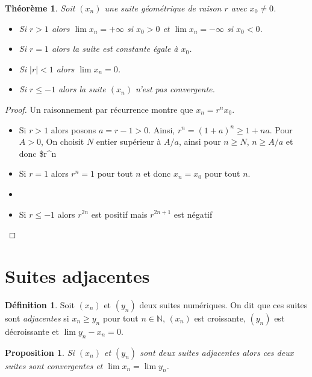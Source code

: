 \documentclass[
]{book}
\providecommand{\tightlist}{%
  \setlength{\itemsep}{0pt}\setlength{\parskip}{0pt}}
\newtheorem{theorem}{Théorème}[chapter]
\newtheorem{proposition}{Proposition}[chapter]
\theoremstyle{definition}
\newtheorem{definition}{Définition}[chapter]
\theoremstyle{definition}
\theoremstyle{definition}
\theoremstyle{definition}
\theoremstyle{remark}
\begin{document}
\begin{theorem}

Soit \((x_n)\) une suite géométrique de raison \(r\) avec \(x_0\neq0\).

\begin{itemize}
\tightlist
\item
  Si \(r>1\) alors \(\lim x_n=+\infty\) si \(x_0>0\) et \(\lim x_n=-\infty\) si \(x_0<0\).
\item
  Si \(r=1\) alors la suite est constante égale à \(x_0\).
\item
  Si \(|r|<1\) alors \(\lim x_n=0\).
\item
  Si \(r\leq -1\) alors la suite \((x_n)\) n'est pas convergente.
\end{itemize}

\end{theorem}

\begin{proof}

Un raisonnement par récurrence montre que \(x_n= r^nx_0\).

\begin{itemize}
\tightlist
\item
  Si \(r>1\) alors posons \(a=r-1>0\). Ainsi, \(r^n=(1+a)^n\geq 1+na\). Pour \(A>0\), On choisit \(N\) entier supérieur à \(A/a\), ainsi pour \(n\geq N\), \(n\geq A/a\) et donc \$r\^{}n\geq
\item
  Si \(r=1\) alors \(r^n=1\) pour tout \(n\) et donc \(x_n=x_0\) pour tout \(n\).
\item
\item
  Si \(r\leq -1\) alors \(r^{2n}\) est positif mais \(r^{2n+1}\) est négatif
\end{itemize}

\end{proof}

\hypertarget{suites-adjacentes}{%
\section{Suites adjacentes}\label{suites-adjacentes}}

\begin{definition}
Soit \((x_n)\) et \((y_n)\) deux suites numériques. On dit que ces suites sont \emph{adjacentes} si \(x_n\geq y_n\) pour tout \(n\in\mathbb{N}\), \((x_n)\) est croissante, \((y_n)\) est décroissante et \(\lim y_n-x_n=0\).
\end{definition}

\begin{proposition}
Si \((x_n)\) et \((y_n)\) sont deux suites adjacentes alors ces deux suites sont convergentes et \(\lim x_n=\lim y_n\).
\end{proposition}
\end{document}
